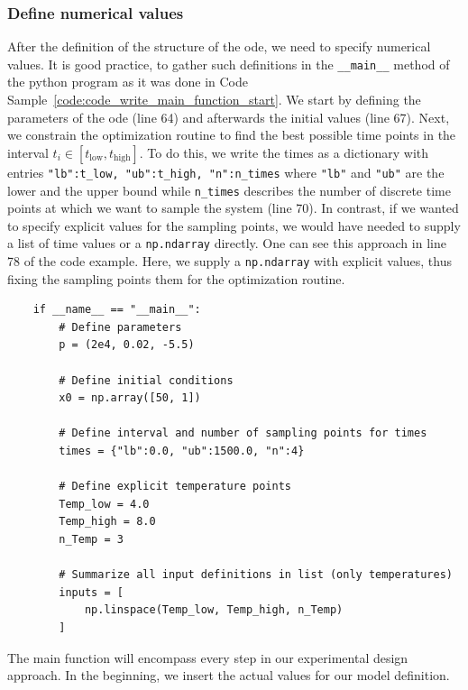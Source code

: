 \documentclass[10pt,A4paper]{article}
\begin{document}
\subsubsection*{Define numerical values}
After the definition of the structure of the \ac{ode}, we need to specify numerical values.
It is good practice, to gather such definitions in the \texttt{__main__} method of the python program as it was done in Code Sample~\ref{code:code_write_main_function_start}.
We start by defining the parameters of the \ac{ode} (line 64) and afterwards the initial values (line 67).
Next, we constrain the optimization routine to find the best possible time points in the interval $t_i\in\left[t_\text{low},t_\text{high}\right]$.
To do this, we write the times as a dictionary with entries \texttt{{"lb":t_low, "ub":t_high, "n":n_times}} where \texttt{"lb"} and \texttt{"ub"} are the lower and the upper bound while \texttt{n_times} describes the number of discrete time points at which we want to sample the system (line 70).
In contrast, if we wanted to specify explicit values for the sampling points, we would have needed to supply a list of time values or a \texttt{np.ndarray} directly.
One can see this approach  in line 78 of the code example.
Here, we supply a \texttt{np.ndarray} with explicit values, thus fixing the sampling points them for the optimization routine.
\begin{code}[h]
    \begin{verbatim}
    if __name__ == "__main__":
        # Define parameters
        p = (2e4, 0.02, -5.5)

        # Define initial conditions
        x0 = np.array([50, 1])

        # Define interval and number of sampling points for times
        times = {"lb":0.0, "ub":1500.0, "n":4}

        # Define explicit temperature points
        Temp_low = 4.0
        Temp_high = 8.0
        n_Temp = 3

        # Summarize all input definitions in list (only temperatures)
        inputs = [
            np.linspace(Temp_low, Temp_high, n_Temp)
        ]
    \end{verbatim}
    \caption{
        The main function will encompass every step in our experimental design approach.
        In the beginning, we insert the actual values for our model definition.
    }
    \label{code:code_write_main_function_start}
\end{code}
\end{document}

